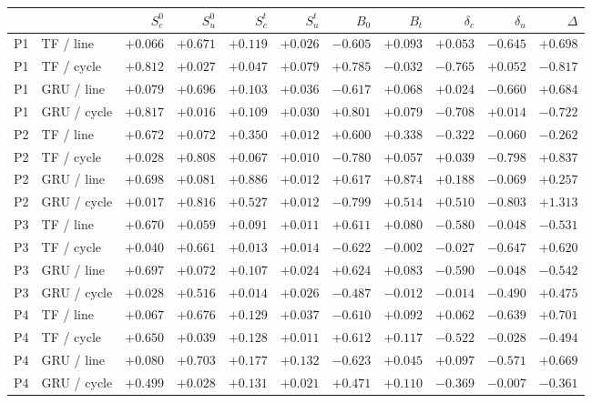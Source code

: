\begin{tabular}{llrrrrrrrrr}
\toprule
& & $S_c^0$ & $S_u^0$ & $S_c^t$ & $S_u^t$ & $B_0$ & $B_t$ & $\delta_c$ & $\delta_u$ & $\Delta$\\
\midrule
P1 & TF / line & $+0.066$ & $+0.671$ & $+0.119$ & $+0.026$ & $-0.605$ & $+0.093$ & $+0.053$ & $-0.645$ & $+0.698$ \\
P1 & TF / cycle & $+0.812$ & $+0.027$ & $+0.047$ & $+0.079$ & $+0.785$ & $-0.032$ & $-0.765$ & $+0.052$ & $-0.817$ \\
P1 & GRU / line & $+0.079$ & $+0.696$ & $+0.103$ & $+0.036$ & $-0.617$ & $+0.068$ & $+0.024$ & $-0.660$ & $+0.684$ \\
P1 & GRU / cycle & $+0.817$ & $+0.016$ & $+0.109$ & $+0.030$ & $+0.801$ & $+0.079$ & $-0.708$ & $+0.014$ & $-0.722$ \\
P2 & TF / line & $+0.672$ & $+0.072$ & $+0.350$ & $+0.012$ & $+0.600$ & $+0.338$ & $-0.322$ & $-0.060$ & $-0.262$ \\
P2 & TF / cycle & $+0.028$ & $+0.808$ & $+0.067$ & $+0.010$ & $-0.780$ & $+0.057$ & $+0.039$ & $-0.798$ & $+0.837$ \\
P2 & GRU / line & $+0.698$ & $+0.081$ & $+0.886$ & $+0.012$ & $+0.617$ & $+0.874$ & $+0.188$ & $-0.069$ & $+0.257$ \\
P2 & GRU / cycle & $+0.017$ & $+0.816$ & $+0.527$ & $+0.012$ & $-0.799$ & $+0.514$ & $+0.510$ & $-0.803$ & $+1.313$ \\
P3 & TF / line & $+0.670$ & $+0.059$ & $+0.091$ & $+0.011$ & $+0.611$ & $+0.080$ & $-0.580$ & $-0.048$ & $-0.531$ \\
P3 & TF / cycle & $+0.040$ & $+0.661$ & $+0.013$ & $+0.014$ & $-0.622$ & $-0.002$ & $-0.027$ & $-0.647$ & $+0.620$ \\
P3 & GRU / line & $+0.697$ & $+0.072$ & $+0.107$ & $+0.024$ & $+0.624$ & $+0.083$ & $-0.590$ & $-0.048$ & $-0.542$ \\
P3 & GRU / cycle & $+0.028$ & $+0.516$ & $+0.014$ & $+0.026$ & $-0.487$ & $-0.012$ & $-0.014$ & $-0.490$ & $+0.475$ \\
P4 & TF / line & $+0.067$ & $+0.676$ & $+0.129$ & $+0.037$ & $-0.610$ & $+0.092$ & $+0.062$ & $-0.639$ & $+0.701$ \\
P4 & TF / cycle & $+0.650$ & $+0.039$ & $+0.128$ & $+0.011$ & $+0.612$ & $+0.117$ & $-0.522$ & $-0.028$ & $-0.494$ \\
P4 & GRU / line & $+0.080$ & $+0.703$ & $+0.177$ & $+0.132$ & $-0.623$ & $+0.045$ & $+0.097$ & $-0.571$ & $+0.669$ \\
P4 & GRU / cycle & $+0.499$ & $+0.028$ & $+0.131$ & $+0.021$ & $+0.471$ & $+0.110$ & $-0.369$ & $-0.007$ & $-0.361$ \\

\end{tabular}

